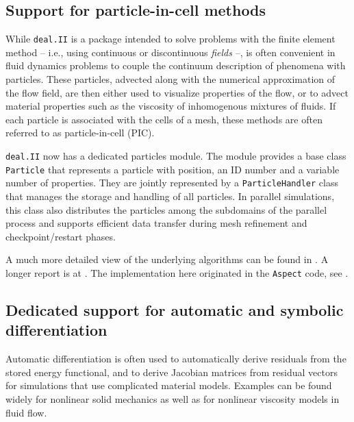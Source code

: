 \documentclass{ansarticle-preprint}
\newcommand{\specialword}[1]{\texttt{#1}}
\newcommand{\dealii}{{\specialword{deal.II}}}
\newcommand{\aspect}{\specialword{Aspect}}
\begin{document}
\subsection{Support for particle-in-cell methods}

While \dealii{} is a package intended to solve problems with the
finite element method -- i.e., using continuous or discontinuous
\textit{fields} --, is often convenient in fluid dynamics problems to
couple the continuum description of phenomena with particles. These
particles, advected along with the numerical approximation of the flow
field, are then either used to visualize properties of the flow, or to
advect material properties such as the viscosity of inhomogenous
mixtures of fluids. If each particle is associated with the cells
of a mesh, these methods are often referred to as particle-in-cell (PIC).

\dealii{} now has a dedicated particles module. The module provides a base class
\texttt{Particle} that represents a particle with position, an ID number and
a variable number of properties. They are jointly represented by a \texttt{ParticleHandler}
class that manages the storage and handling of all particles. In
parallel simulations, this class also
distributes the particles among the subdomains of the parallel process
and supports efficient data transfer during mesh refinement and
checkpoint/restart phases.

A much more detailed view of the underlying algorithms can be found in
\cite{GLHPB18}. A longer report is at \cite{GHPB16}. The
implementation here originated in the \aspect{} code, see \cite{KHB12,HDGB17}.


\subsection{Dedicated support for automatic and symbolic differentiation}

Automatic differentiation is often used to automatically derive
residuals from the stored energy functional, and to derive Jacobian
matrices from residual vectors for simulations that use complicated
material models. Examples can be found widely for nonlinear solid
mechanics as well as for nonlinear viscosity models in fluid flow.
\end{document}
